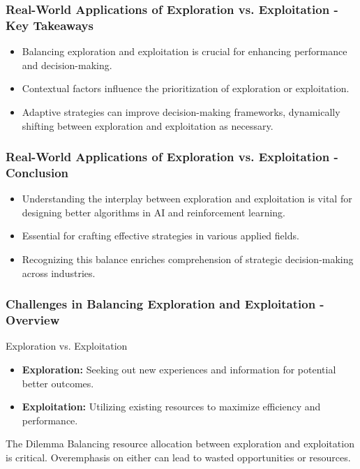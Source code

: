 \documentclass[aspectratio=169]{beamer}
\begin{document}
\begin{frame}[fragile]
    \frametitle{Real-World Applications of Exploration vs. Exploitation - Key Takeaways}
    \begin{itemize}
        \item Balancing exploration and exploitation is crucial for enhancing performance and decision-making.
        \item Contextual factors influence the prioritization of exploration or exploitation.
        \item Adaptive strategies can improve decision-making frameworks, dynamically shifting between exploration and exploitation as necessary.
    \end{itemize}
\end{frame}

\begin{frame}[fragile]
    \frametitle{Real-World Applications of Exploration vs. Exploitation - Conclusion}
    \begin{itemize}
        \item Understanding the interplay between exploration and exploitation is vital for designing better algorithms in AI and reinforcement learning.
        \item Essential for crafting effective strategies in various applied fields.
        \item Recognizing this balance enriches comprehension of strategic decision-making across industries.
    \end{itemize}
\end{frame}

\begin{frame}[fragile]
    \frametitle{Challenges in Balancing Exploration and Exploitation - Overview}
    \begin{block}{Exploration vs. Exploitation}
        \begin{itemize}
            \item \textbf{Exploration:} Seeking out new experiences and information for potential better outcomes.
            \item \textbf{Exploitation:} Utilizing existing resources to maximize efficiency and performance.
        \end{itemize}
    \end{block}
    
    \begin{block}{The Dilemma}
        Balancing resource allocation between exploration and exploitation is critical. Overemphasis on either can lead to wasted opportunities or resources.
    \end{block}
\end{frame}
\end{document}
